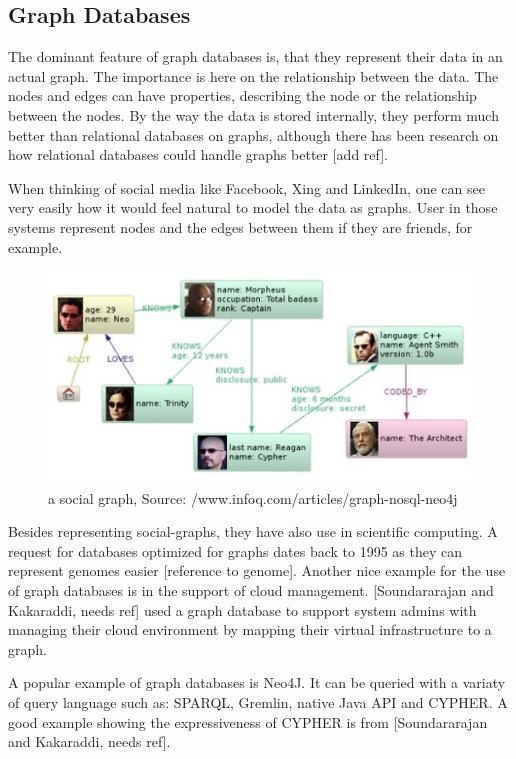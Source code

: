 \documentclass{acm_proc_article-sp}
\begin{document}
\subsection{Graph Databases}

The dominant feature of graph databases is, that they represent their data in an actual graph. The importance is here on the relationship between the data. The nodes and edges can have properties, describing the node or the relationship between the nodes. By the way the data is stored internally, they perform much better than relational databases on graphs, although there has been research on how relational databases could handle graphs better [add ref].

When thinking of social media like Facebook, Xing and LinkedIn, one can see very easily how it would feel natural to model the data as graphs. User in those systems represent nodes and the edges between them if they are friends, for example.

\begin{figure}[hbtp]
	\centering
	\includegraphics[scale=0.5]{neo4j.jpg}
	\caption{a social graph, Source: /www.infoq.com/articles/graph-nosql-neo4j}
\end{figure}

Besides representing social-graphs, they have also use in scientific computing. A request for databases optimized for graphs dates back to 1995 as they can represent genomes easier [reference to genome]. Another nice example for the use of graph databases is in the support of cloud management. [Soundararajan and Kakaraddi, needs ref] used a graph database to support system admins with managing their cloud environment by mapping their virtual infrastructure to a graph. 


A popular example of graph databases is Neo4J. It can be queried with a variaty of query language such as: SPARQL, Gremlin, native Java API and CYPHER. A good example showing the expressiveness of CYPHER is from [Soundararajan and Kakaraddi, needs ref].
\end{document}
